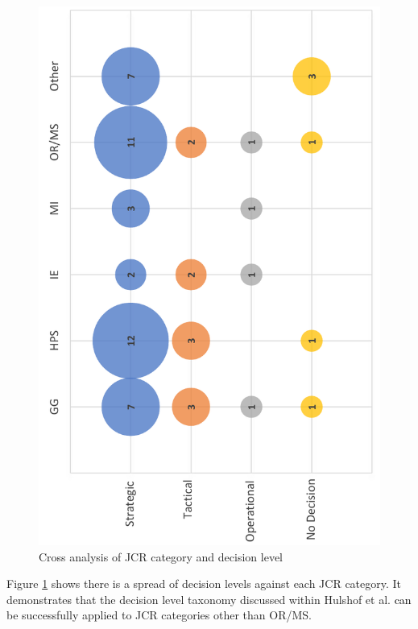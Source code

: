 \documentclass[../thesis.tex]{subfiles}
\begin{document}
\begin{figure}[H]
\centering
 \includegraphics[scale = 0.5,angle=270]{Chapter2/Figures/JCRDecision1.pdf}
 \caption{Cross analysis of JCR category and decision level}
   
    \label{fig:PlanningJCR}
\end{figure}

Figure \ref{fig:PlanningJCR} shows there is a spread of decision levels against each JCR category. It demonstrate\textcolor{black}{s} that the decision level taxonomy discussed within Hulshof et al. \cite{PHulshof} \textcolor{black}{can} be successfully applied to JCR categories other than OR/MS. 
\end{document}
